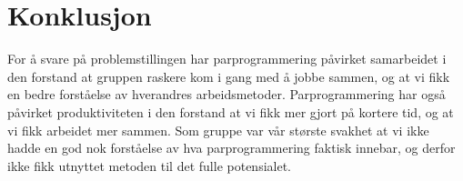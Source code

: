 \section{Konklusjon}

For å svare på problemstillingen har parprogrammering påvirket samarbeidet i den forstand at gruppen raskere kom i gang med å jobbe sammen, og at vi fikk en bedre forståelse av hverandres arbeidsmetoder.
Parprogrammering har også påvirket produktiviteten i den forstand at vi fikk mer gjort på kortere tid, og at vi fikk arbeidet mer sammen.
Som gruppe var vår største svakhet at vi ikke hadde en god nok forståelse av hva parprogrammering faktisk innebar, og derfor ikke fikk utnyttet metoden til det fulle potensialet.

